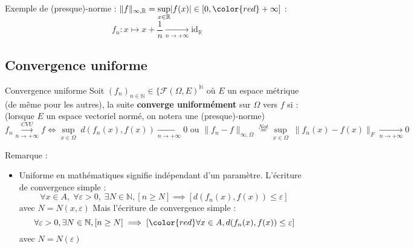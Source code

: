 \begin{itemize}
     \begin{tcolorbox}
       Exemple de (presque)-norme : $\| f \| _{\infty, \mathbb{R}} = \underset{x \in \mathbb{R}}{\sup} |f(x)| \in [0, {\color{red} + \infty]}$ : 
       \begin{equation}
         f_n : x \mapsto x + \frac{1}{n}  \underset{n \to + \infty}{\longrightarrow}  \mathrm{id}_ \mathbb{R}
       \end{equation}
     \end{tcolorbox}

\end{itemize}




\subsection{Convergence uniforme} %
\label{sub:Convergence uniforme}

\begin{Definition}[colbacktitle=red!75!black]{Convergence uniforme}{}
Soit $(f_n) _{n \in \mathbb{N}} \in \{ \mathscr{F}(\Omega, E) ^{\mathbb{N}}$ où $E$ un espace métrique (de même pour les autres), la suite \textbf{converge uniformément} sur $\Omega$ vers $f$ si : (lorsque $E$ un espace vectoriel normé, on notera une (presque)-norme)
\begin{equation}
  f_n  \overset{CVU}{\underset{n \to +\infty}{\longrightarrow}} f \iff \underset{x \in \Omega}{\sup} \; d (f_n(x), f(x))  \underset{n \to + \infty}{\longrightarrow}  0 \text{ ou } \| f_n-f \| _{\infty, \Omega} \overset{Not}{=} \underset{x \in \Omega}{\sup}\; \| f_n(x)- f(x) \|_F  \underset{n \to +\infty}{\longrightarrow} 0
\end{equation}
\end{Definition}

Remarque : 
\begin{itemize}

    \item Uniforme en mathématiques signifie indépendant d'un paramètre. L'écriture de convergence simple : 
      \begin{equation}
        \forall x\in A, \; \forall \varepsilon >0, \; \exists N \in \mathbb{N}, [n \ge N] \implies [d(f_n(x), f(x)) \le \varepsilon]
      \end{equation}
      avec $N = N(x, \varepsilon)$ Mais l'écriture de convergence simple : 
      \begin{equation}
        \forall \varepsilon >0, \exists N \in \mathbb{N}, [n \ge N] \implies [{\color{red} \forall x\in A}, d(f_n(x), f(x)) \le \varepsilon]
      \end{equation}
      avec $N = N(\varepsilon)$
\end{itemize}

